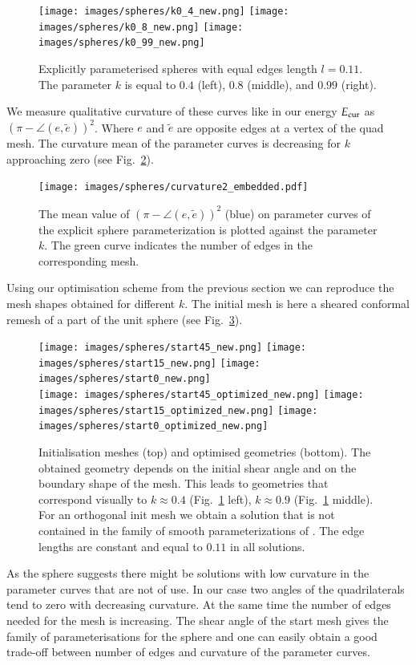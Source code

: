 \documentclass[Thesis.tex]{subfiles}
\begin{document}
\begin{figure}
\centering
\texttt{[image: images/spheres/k0\_4\_new.png]}
\texttt{[image: images/spheres/k0\_8\_new.png]}
\texttt{[image: images/spheres/k0\_99\_new.png]}
\caption{Explicitly parameterised spheres with equal edges length $l=0.11$. The parameter $k$ is equal to $0.4$ (left), $0.8$ (middle), and $0.99$ (right).}
\label{fig:spheres}
\end{figure}

We measure qualitative curvature of these curves like in our energy $E_{\textrm{\scriptsize{cur}}}$ as $(\pi - \angle(e,\tilde e))^2$. Where $e$ and $\tilde e$ are opposite edges at a vertex of the quad mesh. The curvature mean of the parameter curves is decreasing for $k$ approaching zero (see Fig.~\ref{fig:curvature_plot}).
\begin{figure}
\centering
\texttt{[image: images/spheres/curvature2\_embedded.pdf]}
\caption{The mean value of $(\pi - \angle(e,\tilde e))^2$ (blue) on parameter curves of the explicit sphere parameterization is plotted against the parameter $k$. The green curve indicates the number of edges in the corresponding mesh.}
\label{fig:curvature_plot}
\end{figure}
Using our optimisation scheme from the previous section we can reproduce the mesh shapes obtained for different $k$. The initial mesh is here a sheared conformal remesh of a part of the unit sphere (see Fig.~\ref{fig:spheres_optimised}).
\begin{figure}
\centering
\texttt{[image: images/spheres/start45\_new.png]}
\texttt{[image: images/spheres/start15\_new.png]}
\texttt{[image: images/spheres/start0\_new.png]}\\
\texttt{[image: images/spheres/start45\_optimized\_new.png]}
\texttt{[image: images/spheres/start15\_optimized\_new.png]}
\texttt{[image: images/spheres/start0\_optimized\_new.png]}
\caption{Initialisation meshes (top) and optimised geometries (bottom). The obtained geometry depends on the initial shear angle and on the boundary shape of the mesh. This leads to geometries that correspond visually to $k\approx 0.4$ (Fig.~\ref{fig:spheres} left), $k\approx 0.9$ (Fig.~\ref{fig:spheres} middle). For an orthogonal init mesh we obtain a solution that is not contained in the family of smooth parameterizations of \cite{Voss1881}. The edge lengths are constant and equal to $0.11$ in all solutions.}
\label{fig:spheres_optimised}
\end{figure}
As the sphere suggests there might be solutions with low curvature in the parameter curves that are not of use. In our case two angles of the quadrilaterals tend to zero with decreasing curvature. At the same time the number of edges needed for the mesh is increasing. The shear angle of the start mesh gives the family of parameterisations for the sphere and one can easily obtain a good trade-off between number of edges and curvature of the parameter curves.
\end{document}
